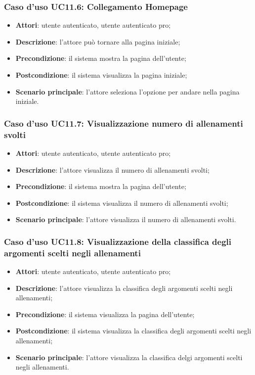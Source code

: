 \subsubsection{Caso d'uso UC11.6: Collegamento Homepage}
\begin{itemize}
\item\textbf{Attori}: utente autenticato, utente autenticato pro;
\item\textbf{Descrizione}: l'attore può tornare alla pagina iniziale;
\item\textbf{Precondizione}: il sistema mostra la pagina dell'utente;
\item\textbf{Postcondizione}: il sistema visualizza la pagina iniziale;
\item\textbf{Scenario principale}: l'attore seleziona l'opzione per andare nella pagina iniziale.
\end{itemize}

\subsubsection{Caso d'uso UC11.7: Visualizzazione numero di allenamenti svolti}
\begin{itemize}
	\item\textbf{Attori}: utente autenticato, utente autenticato pro;
	\item\textbf{Descrizione}: l'attore visualizza il numero di allenamenti svolti;
	\item\textbf{Precondizione}: il sistema mostra la pagina dell'utente;
	\item\textbf{Postcondizione}: il sistema visualizza il numero di allenamenti svolti;
	\item\textbf{Scenario principale}: l'attore visualizza il numero di allenamenti svolti.
\end{itemize}

\subsubsection{Caso d'uso UC11.8: Visualizzazione della classifica degli argomenti scelti negli allenamenti }
\begin{itemize}
	\item\textbf{Attori}: utente autenticato, utente autenticato pro;
	\item\textbf{Descrizione}: l'attore visualizza la classifica degli argomenti scelti negli allenamenti;
	\item\textbf{Precondizione}: il sistema visualizza la pagina dell'utente;
	\item\textbf{Postcondizione}: il sistema visualizza la classifica degli argomenti scelti negli allenamenti;
	\item\textbf{Scenario principale}: l'attore visualizza la classifica delgi argomenti scelti negli allenamenti.
\end{itemize}


